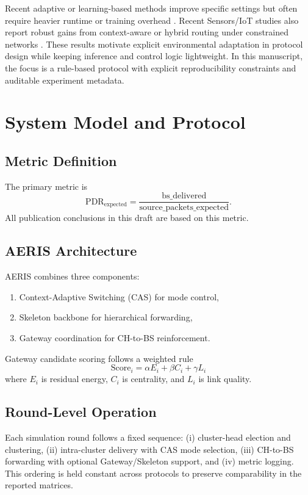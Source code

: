 \documentclass[sensors,article,submit,moreauthors,pdftex]{Definitions/mdpi}
\begin{document}
Recent adaptive or learning-based methods improve specific settings but often require heavier runtime or training overhead \cite{Ren2024,Okine2024,Chen2019Survey}. Recent Sensors/IoT studies also report robust gains from context-aware or hybrid routing under constrained networks \cite{ElFouly2023ILP,Dan2024EMRAR,Bhukya2025Hybrid}. These results motivate explicit environmental adaptation in protocol design while keeping inference and control logic lightweight. In this manuscript, the focus is a rule-based protocol with explicit reproducibility constraints and auditable experiment metadata.

\section{System Model and Protocol}
\subsection{Metric Definition}
The primary metric is
\begin{equation}
\mathrm{PDR}_{\mathrm{expected}} = \frac{\mathrm{bs\_delivered}}{\mathrm{source\_packets\_expected}}.
\end{equation}
All publication conclusions in this draft are based on this metric.

\subsection{AERIS Architecture}
AERIS combines three components:
\begin{enumerate}
\item Context-Adaptive Switching (CAS) for mode control,
\item Skeleton backbone for hierarchical forwarding,
\item Gateway coordination for CH-to-BS reinforcement.
\end{enumerate}
Gateway candidate scoring follows a weighted rule
\begin{equation}
\mathrm{Score}_i = \alpha E_i + \beta C_i + \gamma L_i
\end{equation}
where $E_i$ is residual energy, $C_i$ is centrality, and $L_i$ is link quality.

\subsection{Round-Level Operation}
Each simulation round follows a fixed sequence: (i) cluster-head election and clustering, (ii) intra-cluster delivery with CAS mode selection, (iii) CH-to-BS forwarding with optional Gateway/Skeleton support, and (iv) metric logging. This ordering is held constant across protocols to preserve comparability in the reported matrices.
\end{document}
